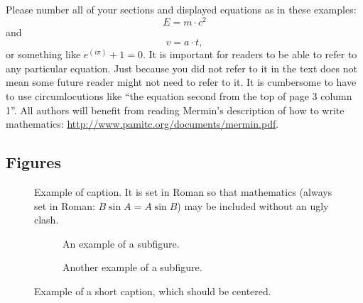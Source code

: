 Please number all of your sections and displayed equations as in these examples:
\begin{equation}
  E = m\cdot c^2
  \label{eq:important}
\end{equation}
and
\begin{equation}
  v = a\cdot t,
  \label{eq:also-important}
\end{equation}
or something like $e^{(i\pi)} + 1 = 0$.
It is important for readers to be able to refer to any particular equation.
Just because you did not refer to it in the text does not mean some future reader might not need to refer to it.
It is cumbersome to have to use circumlocutions like ``the equation second from the top of page 3 column 1''.
All authors will benefit from reading Mermin's description of how to write mathematics:
\url{http://www.pamitc.org/documents/mermin.pdf}.

\subsection{Figures}

\begin{figure}[t]
  \centering
  \fbox{\rule{0pt}{2in} \rule{0.9\linewidth}{0pt}}

   \caption{Example of caption.
   It is set in Roman so that mathematics (always set in Roman: $B \sin A = A \sin B$) may be included without an ugly clash.}
   \label{fig:onecol}
\end{figure}

\begin{figure}
  \centering
  \begin{subfigure}{0.68\linewidth}
    \fbox{\rule{0pt}{2in} \rule{.9\linewidth}{0pt}}
    \caption{An example of a subfigure.}
    \label{fig:short-a}
  \end{subfigure}
  \hfill
  \begin{subfigure}{0.28\linewidth}
    \fbox{\rule{0pt}{2in} \rule{.9\linewidth}{0pt}}
    \caption{Another example of a subfigure.}
    \label{fig:short-b}
  \end{subfigure}
  \caption{Example of a short caption, which should be centered.}
  \label{fig:short}
\end{figure}
\fi

